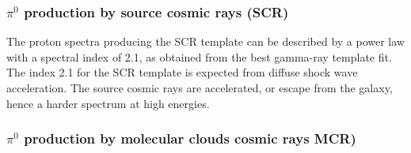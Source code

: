 %

\subsubsection{$\pi^0$ production by source cosmic rays (SCR)}

The proton spectra producing the SCR template can be described by a power law with a spectral index of 2.1, as obtained from the best gamma-ray template fit. The index 2.1 for the SCR template %
is expected from diffuse shock wave acceleration. %
The source cosmic rays are accelerated, or escape from the galaxy, hence a harder spectrum at high energies.


\subsubsection{$\pi^0$ production by molecular clouds cosmic rays MCR)}

